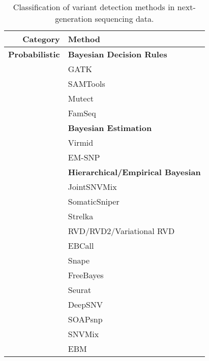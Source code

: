 \documentclass[11pt,reqno]{amsart}
\begin{document}

\begin{table}[htbp]
  \centering
  \caption{Classification of variant detection methods in next-generation sequencing data.}\label{tbl:methods}
  \footnotesize
    \begin{tabular}{rr}
    \toprule
    \textbf{Category} & \multicolumn{1}{l}{\textbf{Method}} \\
    \midrule
    \textbf{Probabilistic} & \multicolumn{1}{l}{\textbf{Bayesian Decision Rules}} \\
          & \multicolumn{1}{l}{\quad GATK} \\
          & \multicolumn{1}{l}{\quad SAMTools} \\
          & \multicolumn{1}{l}{\quad Mutect} \\
          & \multicolumn{1}{l}{\quad FamSeq} \\
          & \multicolumn{1}{l}{\textbf{Bayesian Estimation}} \\
          & \multicolumn{1}{l}{\quad Virmid} \\
          & \multicolumn{1}{l}{\quad EM-SNP} \\
          & \multicolumn{1}{l}{\textbf{Hierarchical/Empirical Bayesian}} \\
          & \multicolumn{1}{l}{\quad JointSNVMix} \\
          & \multicolumn{1}{l}{\quad SomaticSniper} \\
          & \multicolumn{1}{l}{\quad Strelka} \\
          & \multicolumn{1}{l}{\quad RVD/RVD2/Variational RVD} \\
          & \multicolumn{1}{l}{\quad EBCall} \\
          & \multicolumn{1}{l}{\quad Snape} \\
          & \multicolumn{1}{l}{\quad FreeBayes} \\
          & \multicolumn{1}{l}{\quad Seurat} \\
          & \multicolumn{1}{l}{\quad DeepSNV} \\
          & \multicolumn{1}{l}{\quad SOAPsnp} \\
          & \multicolumn{1}{l}{\quad SNVMix} \\
          & \multicolumn{1}{l}{\quad EBM} \\

\end{tabular}
\end{table}
\end{document}
